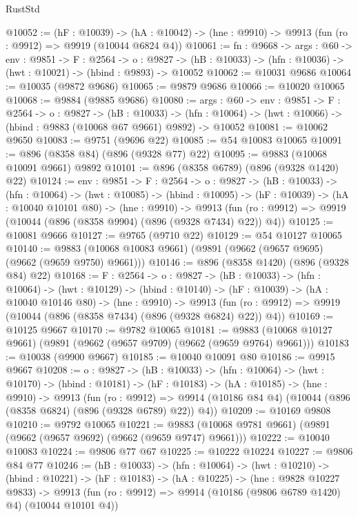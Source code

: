 \begin{lexlean}{RustStd}
\begin{coremodule}
@10052 := (hF : @10039) ->
  (hA : @10042) -> (hne : @9910) -> @9913 (fun (ro : @9912) => @9919 (@10044 @6824 @4))
@10061 := {fn : @9668} ->
  {args : @60} ->
  {env : @9851} ->
  {F : @2564} ->
  {o : @9827} -> (hB : @10033) -> (hfn : @10036) -> (hwt : @10021) -> (hbind : @9893) -> @10052
@10062 := @10031 @9686
@10064 := @10035 (@9872 @9686)
@10065 := @9879 @9686
@10066 := @10020 @10065
@10068 := @9884 (@9885 @9686)
@10080 := {args : @60} ->
  {env : @9851} ->
  {F : @2564} ->
  {o : @9827} ->
  (hB : @10033) ->
  (hfn : @10064) -> (hwt : @10066) -> (hbind : @9883 (@10068 @67 @9661) @9892) -> @10052
@10081 := @10062 @9650
@10083 := @9751 (@9696 @22)
@10085 := @54 @10083 @10065
@10091 := @896 (@8358 @84) (@896 (@9328 @77) @22)
@10095 := @9883 (@10068 @10091 @9661) @9892
@10101 := @896 (@8358 @6789) (@896 (@9328 @1420) @22)
@10124 := {env : @9851} ->
  {F : @2564} ->
  {o : @9827} ->
  (hB : @10033) ->
  (hfn : @10064) ->
  (hwt : @10085) ->
  (hbind : @10095) ->
  (hF : @10039) ->
  (hA : @10040 @10101 @80) ->
  (hne : @9910) ->
  @9913 (fun (ro : @9912) => @9919 (@10044 (@896 (@8358 @9904) (@896 (@9328 @7434) @22)) @4))
@10125 := @10081 @9666
@10127 := @9765 (@9710 @22)
@10129 := @54 @10127 @10065
@10140 := @9883 (@10068 @10083 @9661) (@9891 (@9662 (@9657 @9695) (@9662 (@9659 @9750) @9661)))
@10146 := @896 (@8358 @1420) (@896 (@9328 @84) @22)
@10168 := {F : @2564} ->
  {o : @9827} ->
  (hB : @10033) ->
  (hfn : @10064) ->
  (hwt : @10129) ->
  (hbind : @10140) ->
  (hF : @10039) ->
  (hA : @10040 @10146 @80) ->
  (hne : @9910) ->
  @9913 (fun (ro : @9912) => @9919 (@10044 (@896 (@8358 @7434) (@896 (@9328 @6824) @22)) @4))
@10169 := @10125 @9667
@10170 := @9782 @10065
@10181 := @9883 (@10068 @10127 @9661) (@9891 (@9662 (@9657 @9709) (@9662 (@9659 @9764) @9661)))
@10183 := @10038 (@9900 @9667)
@10185 := @10040 @10091 @80
@10186 := @9915 @9667
@10208 := {o : @9827} ->
  (hB : @10033) ->
  (hfn : @10064) ->
  (hwt : @10170) ->
  (hbind : @10181) ->
  (hF : @10183) ->
  (hA : @10185) ->
  (hne : @9910) ->
  @9913
    (fun (ro : @9912) =>
    @9914 (@10186 @84 @4) (@10044 (@896 (@8358 @6824) (@896 (@9328 @6789) @22)) @4))
@10209 := @10169 @9808
@10210 := @9792 @10065
@10221 := @9883 (@10068 @9781 @9661) (@9891 (@9662 (@9657 @9692) (@9662 (@9659 @9747) @9661)))
@10222 := @10040 @10083
@10224 := @9806 @77 @67
@10225 := @10222 @10224
@10227 := @9806 @84 @77
@10246 := (hB : @10033) ->
  (hfn : @10064) ->
  (hwt : @10210) ->
  (hbind : @10221) ->
  (hF : @10183) ->
  (hA : @10225) ->
  (hne : @9828 @10227 @9833) ->
  @9913 (fun (ro : @9912) => @9914 (@10186 (@9806 @6789 @1420) @4) (@10044 @10101 @4))

\end{coremodule}
\end{lexlean}

